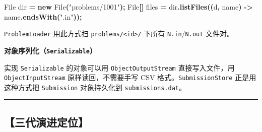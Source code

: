 \documentclass[
  11pt,
]{ctexart}
\newenvironment{Shaded}{\begin{snugshade}}{\end{snugshade}}
\newcommand{\BuiltInTok}[1]{#1}
\newcommand{\FunctionTok}[1]{\textcolor[rgb]{0.13,0.29,0.53}{\textbf{#1}}}
\newcommand{\KeywordTok}[1]{\textcolor[rgb]{0.13,0.29,0.53}{\textbf{#1}}}
\newcommand{\NormalTok}[1]{#1}
\newcommand{\OperatorTok}[1]{\textcolor[rgb]{0.81,0.36,0.00}{\textbf{#1}}}
\newcommand{\StringTok}[1]{\textcolor[rgb]{0.31,0.60,0.02}{#1}}
\begin{document}
\begin{Shaded}
\begin{Highlighting}[]
\BuiltInTok{File}\NormalTok{ dir }\OperatorTok{=} \KeywordTok{new} \BuiltInTok{File}\OperatorTok{(}\StringTok{"problems/1001"}\OperatorTok{);}
\BuiltInTok{File}\OperatorTok{[]}\NormalTok{ files }\OperatorTok{=}\NormalTok{ dir}\OperatorTok{.}\FunctionTok{listFiles}\OperatorTok{((}\NormalTok{d}\OperatorTok{,}\NormalTok{ name}\OperatorTok{)} \OperatorTok{{-}\textgreater{}}\NormalTok{ name}\OperatorTok{.}\FunctionTok{endsWith}\OperatorTok{(}\StringTok{".in"}\OperatorTok{));}
\end{Highlighting}
\end{Shaded}

\texttt{ProblemLoader} 用此方式扫
\texttt{problems/\textless{}id\textgreater{}/} 下所有
\texttt{N.in}/\texttt{N.out} 文件对。

\textbf{对象序列化（\texttt{Serializable}）}

实现 \texttt{Serializable} 的对象可以用 \texttt{ObjectOutputStream}
直接写入文件，用 \texttt{ObjectInputStream} 原样读回，不需要手写 CSV
格式。\texttt{SubmissionStore} 正是用这种方式把 \texttt{Submission}
对象持久化到 \texttt{submissions.dat}。

\begin{center}\rule{0.5\linewidth}{0.5pt}\end{center}

\hypertarget{ux4e09ux4ee3ux6f14ux8fdbux5b9aux4f4d-1}{%
\subsection{【三代演进定位】}\label{ux4e09ux4ee3ux6f14ux8fdbux5b9aux4f4d-1}}
\end{document}
